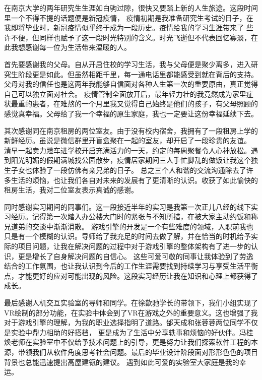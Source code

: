 \begin{acknowledgement}
    
    {
    在南京大学的两年研究生生涯如白驹过隙，很快又要踏上新的人生旅途。这段时间里一个不得不提的话题便是新冠疫情，
    疫情初期是我准备研究生考试的日子，在我即将毕业时，新冠疫情似乎终于成为一段历史。疫情给我的学习生涯带来了
    些许不便，但同样也赋予了这一段时光特别的含义。时光飞逝但不代表回忆寡淡，在此我想感谢每一位为生活带来温暖的人。
    \par
    首先要感谢我的父母。自从开启住校的学习生活，我与父母便是聚少离多，进入研究生阶段更是如此。但虽然相距千里，每一通电话里都能感受到就在背后的支持。父母对我的信任也是这两年我能够自信面对各种人生第一次的重要原由，真正觉得自己可以独立面对社会。
    疫情管制全面放开后，最年轻力壮的我竟然成为家里症状最重的患者，在难熬的一个月里我又觉得自己始终是他们的孩子，有父母照顾的感觉真幸福。父母给了我一个幸福的原生家庭，我也一定要让这份幸福延续下去。
    \par
    其次感谢同在南京租房的两位室友。由于没有校内宿舍，我拥有了一段租房上学的新鲜经历。虽说是微信群里开盲盒聚在一起的室友，却开启了一段珍贵的友谊。
    清早一起卖力蹬车进学校开启充满活力的一天，约定的每周聚餐令人心神放松。遇到阳光明媚的假期满城找公园散步，疫情居家期间三人手忙脚乱的做饭让我这个独生子女也体验了一段仿佛有亲兄弟的日子。
    总之三个人和谐的交流沟通除去了许多生活的烦恼，也让我们各自对未来的发展有了更清晰的认识。收获了如此愉快的租房生活，我对二位室友表示真诚的感谢。
    \par
    同时感谢实习期间的同事们。这一段接近半年的实习是我第一次正儿八经的线下实习经历。记得第一次踏入办公楼大门时的紧张与不知所措，在被大家主动约饭和称兄道弟的交谈中渐渐消散。
    游戏引擎的开发是一个有些难度的领域，入职前我也只是有一个模糊的认识。导师给了我充足的时间去做了解，并在恰当的时机给予实际的项目问题，让我在解决问题的过程中对于游戏引擎的整体架构有了进一步的认识，更是增长了自身解决问题的自信心。
    这些可爱可敬的同事让我体验到了劳逸结合的工作氛围，也让我认识到今后的工作生涯需要找到持续学习与享受生活平衡点，才能更好的应对可能出现的风险。这段实习经历让我在知识和心理上都获得了成长。
    \par
    最后感谢人机交互实验室的导师和同学。在徐歆驰学长的带领下，我们小组实现了VR绘制的部分功能，在实验中体会到了VR在游戏之外的重要意义。这也增强了我对于游戏引擎的理解，为我的职业选择指明了道路。邰天成和张蓉蓉两位同学不仅是实验中鼎力相助的好搭档，
    更是成为了生活中分享轶事和烦恼的好伙伴。冯桂焕老师在实验室中不仅给予技术问题上的引导，更是努力让我们探索软件工程的本源，带领我们从软件角度思考社会问题。最后的毕业设计阶段面对形形色色的项目背景也总能迅速提出高屋建瓴的建议。
    遇到如此可爱的实验室大家庭是我的幸运。
    }
\end{acknowledgement}